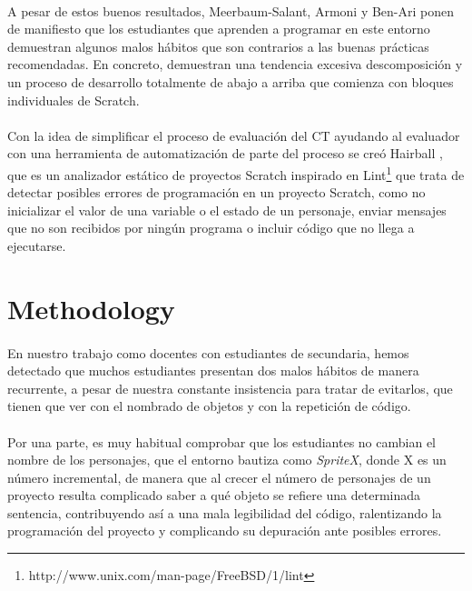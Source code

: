 \documentclass[a4paper,10pt]{article}
\begin{document}
\paragraph{}A pesar de estos buenos resultados, Meerbaum-Salant, Armoni y Ben-Ari \cite{meerbaum2011habits} ponen de manifiesto que los estudiantes que aprenden a programar en este entorno demuestran algunos malos hábitos que son contrarios a las buenas prácticas recomendadas. En concreto, demuestran una tendencia excesiva descomposición y un proceso de desarrollo totalmente de abajo a arriba que comienza con bloques individuales de Scratch.
\paragraph{}Con la idea de simplificar el proceso de evaluación del CT ayudando al evaluador con una herramienta de automatización de parte del proceso se creó Hairball \cite{boe2013hairball}, que es un analizador estático de proyectos Scratch inspirado en Lint\footnote{http://www.unix.com/man-page/FreeBSD/1/lint} que trata de detectar posibles errores de programación en un proyecto Scratch, como no inicializar el valor de una variable o el estado de un personaje, enviar mensajes que no son recibidos por ningún programa o incluir código que no llega a ejecutarse.

\section{Methodology}

\paragraph{}En nuestro trabajo como docentes con estudiantes de secundaria, hemos detectado que muchos estudiantes presentan dos malos hábitos de manera recurrente, a pesar de nuestra constante insistencia para tratar de evitarlos, que tienen que ver con el nombrado de objetos y con la repetición de código.

\paragraph{}Por una parte, es muy habitual comprobar que los estudiantes no cambian el nombre de los personajes, que el entorno bautiza como \textit{SpriteX}, donde X es un número incremental, de manera que al crecer el número de personajes de un proyecto resulta complicado saber a qué objeto se refiere una determinada sentencia, contribuyendo así a una mala legibilidad del código, ralentizando la programación del proyecto y complicando su depuración ante posibles errores.
\end{document}
